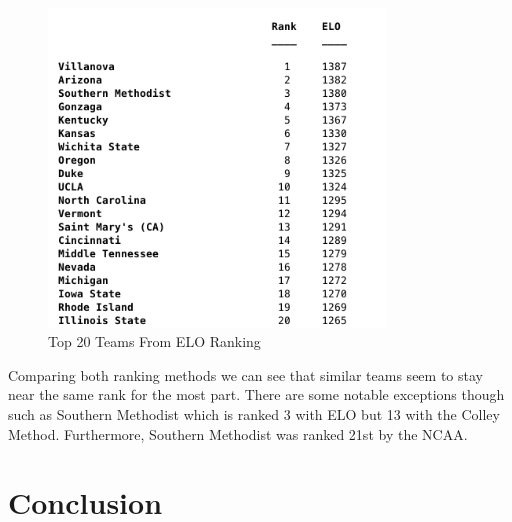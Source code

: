 \documentclass[12pt]{article}
\begin{document}
\begin{figure}[H]
\centering
\includegraphics[width=0.8\textwidth]{Top20ELO}
\caption{Top 20 Teams From ELO Ranking}
\label{fig:20TeamELO}
\end{figure}
Comparing both ranking methods we can see that similar teams seem to stay near the same rank for the most part. There are some notable exceptions though such as Southern Methodist which is ranked 3 with ELO but 13 with the Colley Method. Furthermore, Southern Methodist was ranked 21st by the NCAA.











\section{Conclusion}
\label{sec:conc}
\end{document}

